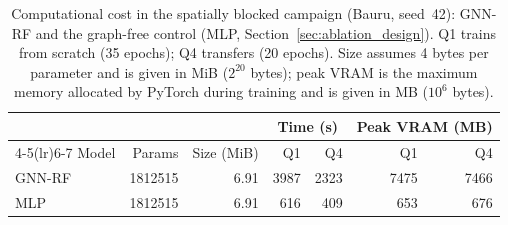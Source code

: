 \begin{table}[!t]
\centering
\caption{Computational cost in the spatially blocked campaign (Bauru, seed~42): GNN-RF and the graph-free control (MLP, Section~\ref{sec:ablation_design}). Q1 trains from scratch (35 epochs); Q4 transfers (20 epochs). Size assumes 4 bytes per parameter and is given in MiB ($2^{20}$ bytes); peak VRAM is the maximum memory allocated by PyTorch during training and is given in MB ($10^{6}$ bytes).}
\label{tab:cost}
\setlength{\tabcolsep}{4pt}
\begin{tabular}{lrrrrrr}
\toprule
 & & & \multicolumn{2}{c}{Time (s)} & \multicolumn{2}{c}{Peak VRAM (MB)} \\
\cmidrule(lr){4-5}\cmidrule(lr){6-7}
Model & Params & Size (MiB) & Q1 & Q4 & Q1 & Q4 \\
\midrule
GNN-RF & \num{1812515} & 6.91 & 3987 & 2323 & 7475 & 7466 \\
MLP & \num{1812515} & 6.91 & 616 & 409 & 653 & 676 \\
\bottomrule
\end{tabular}
\end{table}
